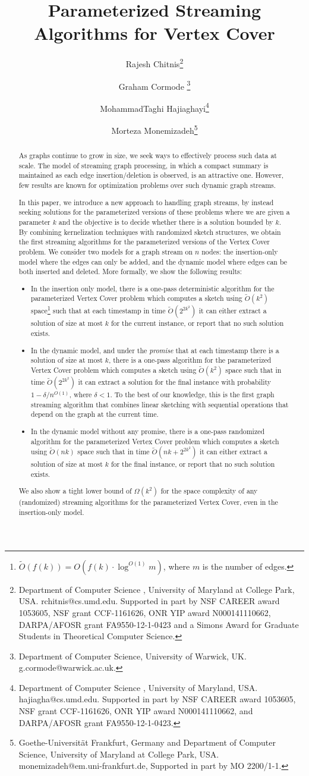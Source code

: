 \documentclass[11pt,letter]{article}
\title{Parameterized Streaming Algorithms for Vertex Cover}
\author{
Rajesh Chitnis\thanks{Department of Computer Science , University of Maryland at
College Park, USA.  rchitnis@cs.umd.edu. Supported in part by NSF CAREER award 1053605, NSF grant CCF-1161626, ONR YIP award
N000141110662, DARPA/AFOSR grant FA9550-12-1-0423 and a Simons Award for Graduate Students in Theoretical Computer Science.}
\and
Graham Cormode \thanks{Department of Computer Science, University of
  Warwick, UK. g.cormode@warwick.ac.uk.}
\and
 MohammadTaghi Hajiaghayi\thanks{Department of Computer Science , University of Maryland,
 USA.  hajiagha@cs.umd.edu. Supported in part by NSF CAREER award 1053605, NSF grant CCF-1161626, ONR YIP award
N000141110662, and DARPA/AFOSR grant FA9550-12-1-0423.}
\and
Morteza Monemizadeh\thanks{Goethe-Universit\"{a}t Frankfurt, Germany and Department of Computer Science, University of Maryland at
College Park, USA.   monemizadeh@em.uni-frankfurt.de,
Supported in part by MO 2200/1-1.}
}
\begin{document}
\sloppy
\maketitle


\begin{abstract}
As graphs continue to grow in size, we seek ways to effectively process such data at scale.
The model of streaming graph processing, in which a compact summary is maintained as each
edge insertion/deletion is observed, is an attractive one.
However, few results are known for optimization problems over such dynamic graph streams.

In this paper, we introduce a new approach to handling graph streams,
by instead seeking solutions for the parameterized versions of these problems
where we are given a parameter $k$ and the objective is to decide
whether there is a solution bounded by $k$.
By combining kernelization techniques with randomized sketch structures,
we obtain the first streaming algorithms for the parameterized versions of
the Vertex Cover problem. We consider two models for a graph stream on
$n$ nodes:
the insertion-only model where the edges can only be added,
and the dynamic model where edges can be both inserted and deleted.
More formally, we show the following results:

\begin{itemize}
\item In the insertion only model, there is a one-pass deterministic algorithm
for the parameterized Vertex Cover problem which computes a sketch
using $\tilde{O}(k^{2})$ space\footnote{$\tilde{O}(f(k))=O(f(k)\cdot
  \log^{O(1)} m)$, where $m$ is the number of edges.} such that at each
  timestamp in time $\tilde{O}(2^{2k^2})$ it can either extract a solution of
  size at most $k$ for the current instance, or report that no such solution exists.

\item In the dynamic model, and under the \emph{promise} that at each
timestamp there is a solution of size at most $k$, there is a one-pass
algorithm for the parameterized Vertex Cover problem which computes
a sketch using $\tilde{O}(k^{2})$ space such that in time $\tilde{O}(2^{2k^2})$ it can
extract a solution for the final instance with probability $1-\delta/{n^{O(1)}}$, where $\delta<1$.
To the best of our knowledge, this is the first graph streaming algorithm that combines linear
sketching with sequential operations that depend on the graph at the current time.


\item In the dynamic model without any promise, there is a one-pass
randomized algorithm for the parameterized Vertex Cover problem
which computes a sketch using $\tilde{O}(nk)$ space such that in time $\tilde{O}(nk+2^{2k^2})$ it can either extract a solution of size
at most $k$ for the final instance, or report that no such solution exists.
\end{itemize}
We also show a tight lower bound of $\Omega(k^2)$ for the space
complexity of any (randomized) streaming algorithms for
the parameterized Vertex Cover, even in the insertion-only model.
\end{abstract}
\end{document}
